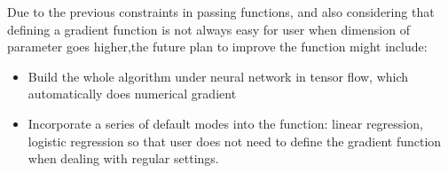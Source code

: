 \documentclass[11pt]{article}
\begin{document}
Due to the previous constraints in passing functions, and also considering that defining a gradient function is not always easy for user when dimension of parameter goes higher,the future plan to improve the function might include:
\begin{itemize}
    \item Build the whole algorithm under neural network in tensor flow, which automatically does numerical gradient
    \item Incorporate a series of default modes into the function: linear regression, logistic regression so that user does not need to define the gradient function when dealing with regular settings.
\end{itemize}


\end{document}
